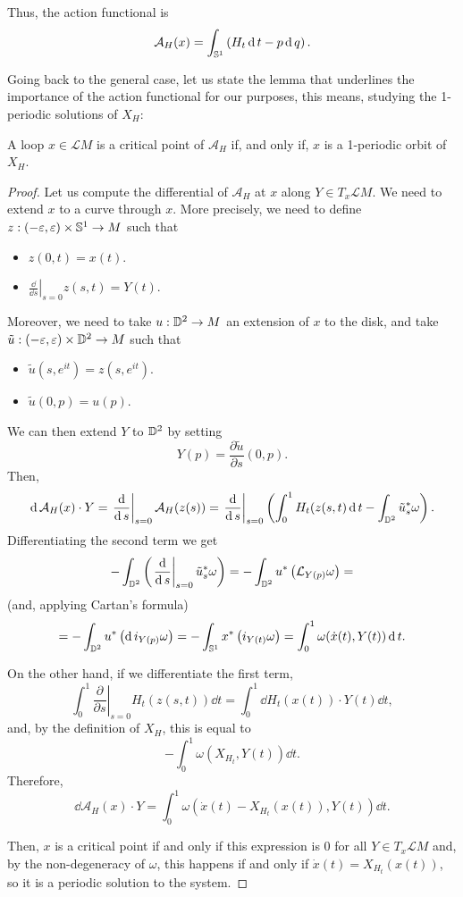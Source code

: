 Thus, the action functional is
$$\mathcal{A}_H (x) = \int_{\mathbb{S}^1} \left( H_t \operatorname d t - p \operatorname d q \right) .$$

Going back to the general case, let us state the lemma that underlines the importance of the action functional for our purposes, this means, studying the 1-periodic solutions of $X_H$:

\begin{prop}
A loop $x \in \mathcal{L}M$ is a critical point of $\mathcal{A}_H$ if, and only if, $x$ is a 1-periodic orbit of $X_H$.
\end{prop}

\begin{proof}
Let us compute the differential of $\mathcal{A}_H$ at $x$ along $Y \in T_x\mathcal{L}M$. We need to extend $x$ to a curve through $x$. More precisely, we need to define $z : (-\varepsilon,\varepsilon) \times \mathbb{S}^1 \rightarrow M$ such that

\begin{itemize}
	\item $z(0,t) = x(t)$.
	\item $\left. \frac{\dd}{\dd s} \right|_{s=0} z(s,t) = Y(t)$.
\end{itemize}

Moreover, we need to take $u : \mathbb{D}^2 \rightarrow M$ an extension of $x$ to the disk, and take $\tilde{u} : (-\varepsilon,\varepsilon) \times \mathbb{D}^2 \rightarrow M$ such that

\begin{itemize}
	\item $\tilde{u}(s,e^{it}) = z(s,e^{it})$.
	\item $\tilde{u}(0,p) = u(p)$.
\end{itemize}

We can then extend $Y$ to $\mathbb{D}^2$ by setting
$$Y(p) = \frac{\partial \tilde{u}}{\partial s} (0,p) .$$
Then,
$$\operatorname d \mathcal{A}_H(x) \cdot Y = \left. \frac{\operatorname d}{\operatorname d s} \right|_{s=0} \mathcal{A}_H(z(s)) = \left. \frac{\operatorname d}{\operatorname d s} \right|_{s=0} \left( \int_0^1 H_t(z(s,t) \operatorname d t - \int_{\mathbb{D}^2} \tilde{u}_s^{\ast} \omega \right) .$$
Differentiating the second term we get
$$- \int_{\mathbb{D}^2} \left( \left. \frac{\operatorname d}{\operatorname d s} \right|_{s=0} \tilde{u}_s^{\ast} \omega \right) = - \int_{\mathbb{D}^2} u^{\ast} \left( \mathcal{L}_{Y(p)} \omega \right) =$$
(and, applying Cartan's formula)
$$= - \int_{\mathbb{D}^2} u^{\ast} \left( \operatorname d i_{Y(p)} \omega \right) = - \int_{\mathbb{S}^1} x^{\ast} \left( i_{Y(t)} \omega \right) = \int_0^1 \omega(\dot{x}(t),Y(t)) \operatorname d t .$$

On the other hand, if we differentiate the first term,
$$\int_0^1 \left. \frac{\partial}{\partial s} \right|_{s=0} H_t(z(s,t)) \dd t = \int_0^1 \dd H_t(x(t)) \cdot Y(t) \dd t ,$$
and, by the definition of $X_H$, this is equal to
$$- \int_0^1 \omega(X_{H_t},Y(t)) \dd t .$$
Therefore,
$$\dd \mathcal{A}_H(x) \cdot Y = \int_0^1 \omega(\dot{x}(t) - X_{H_t}(x(t)), Y(t)) \dd t .$$

Then, $x$ is a critical point if and only if this expression is $0$ for all $Y \in T_x\mathcal{L}M$ and, by the non-degeneracy of $\omega$, this happens if and only if $\dot{x}(t) = X_{H_t}(x(t))$, so it is a periodic solution to the system.
\end{proof}
